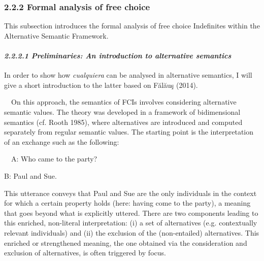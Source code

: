 \subsubsection[2.2.2 Formal analysis of free choice]{\textbf{2.2.2 Formal analysis of free choice}}
\begin{styleStandard}
This subsection introduces the formal analysis of free choice Indefinites within the Alternative Semantic Framework.
\end{styleStandard}

\paragraph[2.2.2.1 Preliminaries: An introduction to alternative semantics]{\textit{2.2.2.1 Preliminaries: An introduction to alternative semantics}}
\begin{styleStandard}
In order to show how \textit{cualquiera} can be analysed in alternative semantics, I will give a short introduction to the latter based on Fălăuş (2014).
\end{styleStandard}

\begin{styleStandard}
\ \ On this approach, the semantics of FCIs involves considering alternative semantic values. The theory was developed in a framework of bidimensional semantics (cf. Rooth 1985), where alternatives are introduced and computed separately from regular semantic values. The starting point is the interpretation of an exchange such as the following:
\end{styleStandard}

\begin{styleStandard}
\ \ A: Who came to the party? 
\end{styleStandard}

\begin{styleStandard}
B: Paul and Sue.
\end{styleStandard}

\begin{styleStandard}
This utterance conveys that Paul and Sue are the only individuals in the context for which a certain property holds (here: having come to the party), a meaning that goes beyond what is explicitly uttered. There are two components leading to this enriched, non-literal interpretation: (i) a set of alternatives (e.g. contextually relevant individuals) and (ii) the exclusion of the (non-entailed) alternatives. This enriched or strengthened meaning, the one obtained via the consideration and exclusion of alternatives, is often triggered by focus.
\end{styleStandard}

